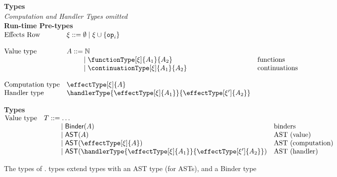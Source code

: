 \begin{figure}[t]
  \begin{core-desc}
    {\large {\textbf{Types}}}\\
    \textit{Computation and Handler Types omitted}\\

    \textbf{Run-time Pre-types}\\
    $\begin{array}{@{}lllr}
    \text{Effects Row} & \xi ::= \emptyset \mid \xi \cup \{ \texttt{op}_i \} \\
    \\
    \text{Value type} & A ::= \mathbb{N} & \\
                              &\quad\quad\,\,\, \mid \functionType[\xi]{A_1}{A_2} & \text{functions}\\
                              &\quad\quad\,\,\, \mid \continuationType[\xi]{A_1}{A_2} & \text{continuations}\\ \\
    \text{Computation type} & \effectType[\xi]{A} \\
    \text{Handler type} & \handlerType{\effectType[\xi]{A_1}}{\effectType[\xi']{A_2}}
    \end{array}$
    
    \vspace{4mm}

    \textbf{Types}\\
  $\begin{array}{@{}lllr}
    \text{Value type} & T ::= \ldots\\
                              &\quad\quad\,\,\, \mid \textsf{Binder}(A) & \text{binders}\\
                              &\quad\quad\,\,\, \mid \textsf{AST}(A) & \text{AST (value)}\\
                              &\quad\quad\,\,\, \mid \textsf{AST}(\effectType[\xi]{A}) & \text{AST (computation)}\\
                              &\quad\quad\,\,\, \mid \textsf{AST}(\handlerType{\effectType[\xi]{A_1}}{\effectType[\xi']{A_2}}) & \text{AST (handler)}\\
  \end{array}$
  \end{core-desc}
  \caption{The types of \coreLang{}. \coreLang{} types extend \efflang{} types with an \textsf{AST} type (for ASTs), and a \textsf{Binder} type}%
  \label{fig:core-types}
\end{figure}

